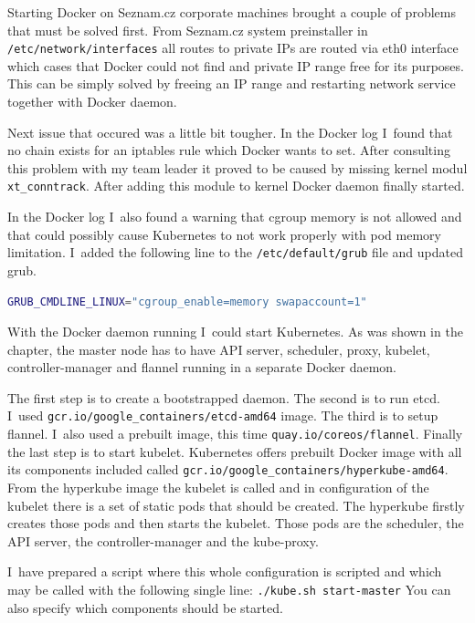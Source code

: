 Starting Docker on Seznam.cz corporate machines brought a couple of problems that must be solved first. From Seznam.cz system preinstaller in \lstinline{/etc/network/interfaces} all routes to private IPs are routed via eth0 interface which cases that Docker could not find and private IP range free for its purposes. This can be simply solved by freeing an IP range and restarting network service together with Docker daemon.

Next issue that occured was a little bit tougher. In the Docker log I~found that no chain exists for an iptables rule which Docker wants to set. After consulting this problem with my team leader it proved to be caused by missing kernel modul \lstinline{xt_conntrack}. After adding this module to kernel Docker daemon finally started.

In the Docker log I~also found a warning that cgroup memory is not allowed and that could possibly cause Kubernetes to not work properly with pod memory limitation. I~added the following line to the \lstinline{/etc/default/grub} file and updated grub.
\begin{lstlisting}[language=bash]
  GRUB_CMDLINE_LINUX="cgroup_enable=memory swapaccount=1"
\end{lstlisting}

With the Docker daemon running I~could start Kubernetes. As was shown in the  chapter, the master node has to have API server, scheduler, proxy, kubelet, controller-manager and flannel running in a separate Docker daemon.

The first step is to create a bootstrapped daemon. The second is to run etcd. I~used \lstinline{gcr.io/google_containers/etcd-amd64} image. The third is to setup flannel. I~also used a prebuilt image, this time \lstinline{quay.io/coreos/flannel}. Finally the last step is to start kubelet. Kubernetes offers prebuilt Docker image with all its components included called \lstinline{gcr.io/google_containers/hyperkube-amd64}. From the hyperkube image the kubelet is called and in configuration of the kubelet there is a set of static pods that should be created. The hyperkube firstly creates those pods and then starts the kubelet. Those pods are the scheduler, the API server, the controller-manager and the kube-proxy.

I~have prepared a script where this whole configuration is scripted and which may be called with the following single line: \lstinline{./kube.sh start-master} You can also specify which components should be started.


